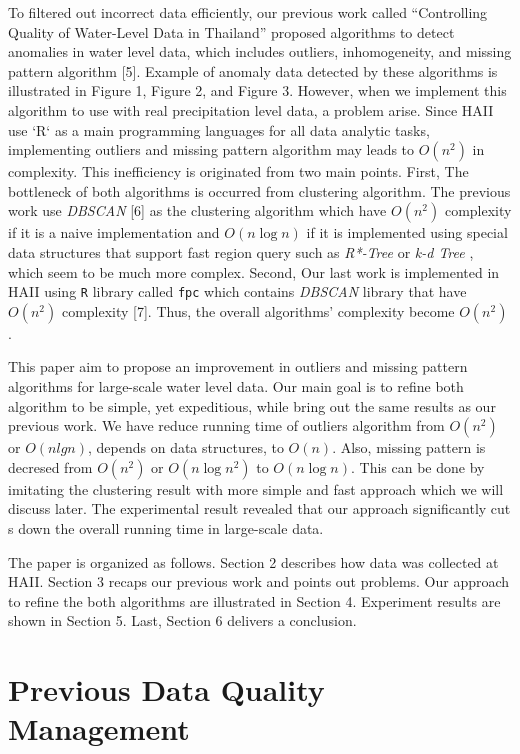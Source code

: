 \documentclass[conference]{IEEEtran}
\begin{document}
To filtered out incorrect data efficiently, our previous work called “Controlling Quality of Water-Level Data in Thailand” proposed algorithms to detect anomalies in water level data, which includes outliers, inhomogeneity, and missing pattern algorithm [5]. Example of anomaly data detected by these algorithms is illustrated in Figure 1, Figure 2, and Figure 3. However, when we implement this algorithm to use with real precipitation level data, a problem arise. Since HAII use `R` as a main programming languages for all data analytic tasks, implementing outliers and missing pattern algorithm may leads to $O(n^2)$ in complexity. This inefficiency is originated from two main points. First, The bottleneck of both algorithms is occurred from clustering algorithm. The previous work use \textit{DBSCAN} [6] as the clustering algorithm which have $O(n^2)$ complexity if it is a naive implementation and $O(n\log{n})$ if it is implemented using special data structures that support fast region query such as \textit{R*-Tree} or \textit{k-d Tree} , which seem to be much more complex. Second, Our last work is implemented in HAII using \texttt{R} library called \texttt{fpc} which contains \textit{DBSCAN} library that have $O(n^2)$ complexity [7]. Thus, the overall algorithms’ complexity become $O(n^2)$.

This paper aim to propose an improvement in outliers and missing pattern algorithms for large-scale water level data. Our main goal is to refine both algorithm to be simple, yet expeditious, while bring out the same results as our previous work. We have reduce running time of outliers algorithm from $O(n^2)$ or $O(n lg n)$, depends on data structures, to $O(n)$. Also, missing pattern is decresed from $O(n^2)$ or $O(n \log{n}^2)$ to $O(n \log{n})$. This can be  done by imitating the clustering result with more simple and fast approach which we will discuss later. The experimental result revealed that our approach significantly cut s down the overall running time in large-scale data.

The paper is organized as follows. Section 2 describes how data was collected at HAII. Section 3 recaps our previous work and points out problems. Our approach to refine the both algorithms are illustrated in Section 4. Experiment results are shown in Section 5. Last, Section 6 delivers a conclusion.

\section{Previous Data Quality Management}
\end{document}
